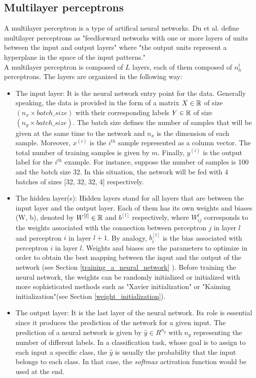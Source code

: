 \subsection{Multilayer perceptrons}
\label{multilayer_perceptron}

\setlength{\marginparwidth}{3cm}\leavevmode {}A multilayer perceptron is a type of artifical neural networks. Du et al. \cite{23} define multilayer perceptrons as "feedforward networks with one or more layers of units between the
input and output layers" where "the output units represent a hyperplane in the space
of the input patterns."\\
A multilayer perceptron is composed of $L$ layers, each of them composed of $n^{l}_{h}$ perceptrons. The layers are organized in the following way:
\begin{itemize}
\item The input layer: It is the neural network entry point for the data. Generally speaking, the data is provided in the form of a matrix $X \in \mathbb{R}$ of size $(n_{x} \times batch\_size)$ with their corresponding labels $Y \in \mathbb{R}$ of size $(n_{y} \times batch\_size)$. The batch size defines the number of samples that will be given at the same time to the network and $n_{x}$ is the dimension of each sample. Moreover, $x^{(i)}$ is the $i^{th}$ sample represented as a column vector. The total number of training samples is given by $m$. Finally, $y^{(i)}$ is the output label for the $i^{th}$ example. For instance, suppose the number of samples is 100 and the batch size 32. In this situation, the network will be fed with 4 batches of sizes [32, 32, 32, 4] respectively. 

\item The hidden layer(s): Hidden layers stand for all layers that are between the input layer and the output layer. Each of them has its own weights and biases (W, b), denoted by $W^{[l]} \in \mathbb{R} $ and $b^{[l]}$ respectively, where $W_{ij}^{l}$ corresponds to the weights associated with the connection between perceptron $j$ in layer $l$ and perceptron $i$ in layer $l+1$. By analogy, $b_{i}^{[l]}$ is the bias associated with perceptron $i$ in layer $l$. Weights and biases are the parameters to optimize in order to obtain the best mapping between the input and the output of the network (see Section \ref{training_a_neural_network} ). Before training the neural network, the weights can be randomly initialized or initialized with more sophisticated methods such as "Xavier initialization" or "Kaiming initialization"(see Section \ref{weight_initialization}).

\item The output layer: It is the last layer of the neural network. Its role is essential since it produces the prediction of the network for a given input. The prediction of a neural network is given by $\hat{y} \in R^{n_{y}}$ with $n_{y}$ representing the number of different labels. In a classification task, whose goal is to assign to each input a specific class, the $\hat{y}$ is usually the probability that the input belongs to each class. In that case, the \textit{softmax} activation function would be used at the end.
\end{itemize}
